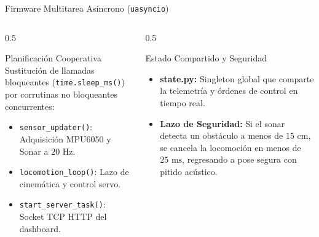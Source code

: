 \documentclass[10pt, aspectratio=169]{beamer}
\newcommand{\codigo}[1]{\texttt{#1}}
\begin{document}
\begin{frame}{Firmware Multitarea Asíncrono (\codigo{uasyncio})}
    \begin{columns}
        \begin{column}{0.5\textwidth}
            \begin{block}{Planificación Cooperativa}
                Sustitución de llamadas bloqueantes (\codigo{time.sleep\_ms()}) por corrutinas no bloqueantes concurrentes:
                \begin{itemize}
                    \item \codigo{sensor\_updater()}: Adquisición MPU6050 y Sonar a $20\text{ Hz}$.
                    \item \codigo{locomotion\_loop()}: Lazo de cinemática y control servo.
                    \item \codigo{start\_server\_task()}: Socket TCP HTTP del dashboard.
                \end{itemize}
            \end{block}
        \end{column}
        \begin{column}{0.5\textwidth}
            \begin{alertblock}{Estado Compartido y Seguridad}
                \begin{itemize}
                    \item \textbf{state.py:} Singleton global que comparte la telemetría y órdenes de control en tiempo real.
                    \item \textbf{Lazo de Seguridad:} Si el sonar detecta un obstáculo a menos de $15\text{ cm}$, se cancela la locomoción en menos de $25\text{ ms}$, regresando a pose segura con pitido acústico.
                \end{itemize}
            \end{alertblock}
        \end{column}
    \end{columns}
\end{frame}
\end{document}

